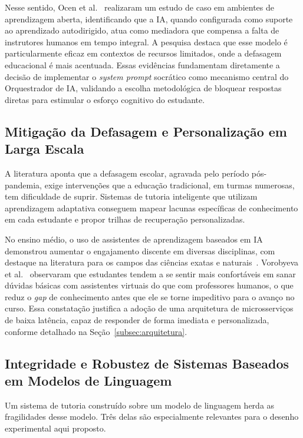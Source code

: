 \documentclass[10pt, a4paper, twocolumn]{article}
\begin{document}
Nesse sentido, Ocen et al.~\cite{ocen2026} realizaram um estudo de caso em
ambientes de aprendizagem aberta, identificando que a IA, quando configurada
como suporte ao aprendizado autodirigido, atua como mediadora que compensa a
falta de instrutores humanos em tempo integral. A pesquisa destaca que esse
modelo é particularmente eficaz em contextos de recursos limitados, onde a
defasagem educacional é mais acentuada. Essas evidências fundamentam diretamente
a decisão de implementar o \textit{system prompt} socrático como mecanismo
central do Orquestrador de IA, validando a escolha metodológica de bloquear
respostas diretas para estimular o esforço cognitivo do estudante.

\subsection{Mitigação da Defasagem e Personalização em Larga Escala}

A literatura aponta que a defasagem escolar, agravada pelo período
pós-pandemia, exige intervenções que a educação tradicional, em turmas
numerosas, tem dificuldade de suprir. Sistemas de tutoria inteligente que
utilizam aprendizagem adaptativa conseguem mapear lacunas específicas de
conhecimento em cada estudante e propor trilhas de recuperação personalizadas.

No ensino médio, o uso de assistentes de aprendizagem baseados em IA demonstrou
aumentar o engajamento discente em diversas disciplinas, com destaque na
literatura para os campos das ciências exatas e naturais~\cite{roe2025}.
Vorobyeva et al.~\cite{roe2025} observaram que estudantes tendem a se sentir
mais confortáveis em sanar dúvidas básicas com assistentes virtuais do que com
professores humanos, o que reduz o \textit{gap} de conhecimento antes que ele se
torne impeditivo para o avanço no curso. Essa constatação justifica a adoção de
uma arquitetura de microsserviços de baixa latência, capaz de responder de forma
imediata e personalizada, conforme detalhado na Seção~\ref{subsec:arquitetura}.

\subsection{Integridade e Robustez de Sistemas Baseados em Modelos de Linguagem}
\label{subsec:integridade}

Um sistema de tutoria construído sobre um modelo de linguagem herda as
fragilidades desse modelo. Três delas são especialmente relevantes para o
desenho experimental aqui proposto.
\end{document}
